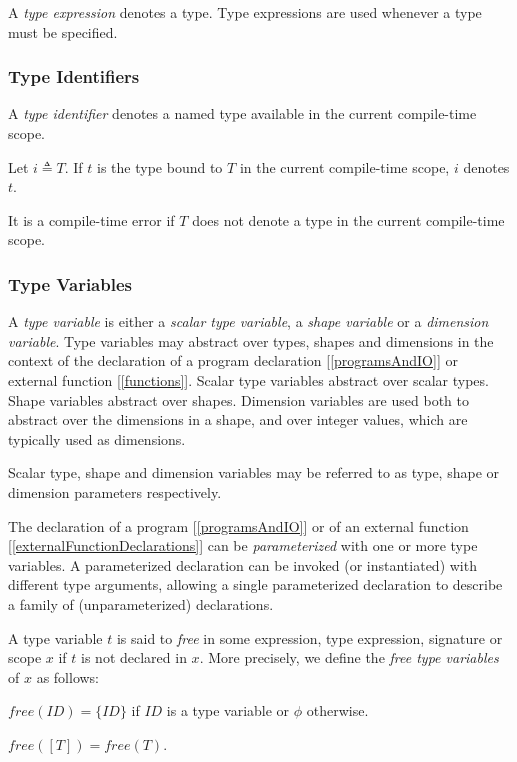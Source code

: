 \documentclass{article}
\begin{document}
A {\em type expression} denotes a type. Type expressions are used whenever a type must be specified.


\subsubsection{Type Identifiers}
\label{typeIdentifiers}

A {\em type identifier} denotes a named type available in the current compile-time scope.

Let $i \triangleq T$. If $t$ is the type bound to $T$ in the current compile-time scope, $i$ denotes $t$. 

It is a compile-time error if $T$ does not denote a type in the current compile-time scope.

\subsubsection{Type Variables}
\label{typeVariables}

A {\em type variable} is either a {\em scalar type variable}, a {\em shape variable} or a {\em dimension variable}. Type variables may abstract over types, shapes and dimensions in the context of the declaration of a program declaration [\ref{programsAndIO}] or external function [\ref{functions}]. Scalar type variables abstract over  scalar types. Shape variables abstract over shapes. Dimension variables are used both to abstract over the dimensions in a shape, and over integer values, which are typically used as dimensions.

Scalar type, shape and dimension variables may be referred to as type, shape or dimension parameters respectively.

 The declaration of a program [\ref{programsAndIO}] or of an external function [\ref{externalFunctionDeclarations}] can be {\em parameterized} with one or more type variables. A parameterized declaration can be invoked (or instantiated) with different type arguments, allowing a single parameterized declaration to describe a family of (unparameterized) declarations. 
 
 A type variable $t$ is said to {\em free} in some expression, type expression, signature or scope $x$ if $t$ is not declared in $x$.  More precisely, we define the {\em free type variables} of $x$ as follows:
 
 
 $free(ID) = \{ID\}$ if $ID$ is a type variable or $\phi$ otherwise.
 
 $free([T]) = free(T)$.
 
\end{document}
